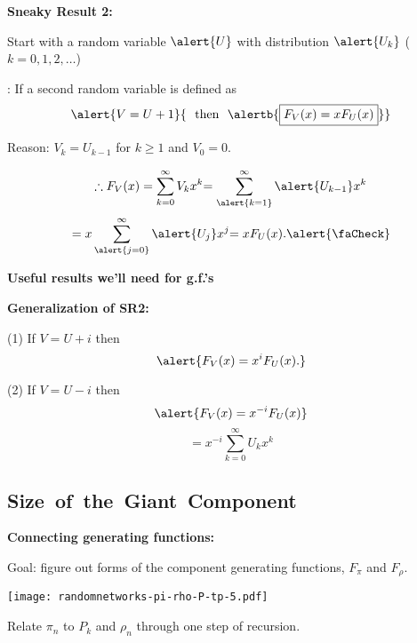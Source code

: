 \begin{frame}[label=]
\begin{frame}[label=]
\begin{frame}[label=]
\begin{frame}[label=]
\begin{frame}[label=]
\begin{frame}[label=]
\begin{frame}[label=]
\begin{frame}[label=]
\begin{frame}[label=]
\begin{frame}[label=]
\begin{frame}[label=]
\begin{frame}[label=rn-sneakyresult1]
\begin{frame}[label=]
\begin{frame}[label=]
\begin{frame}[label=rn-sneakyresult2]
  \textbf{Sneaky Result 2:}
    
    
      Start with a random variable $\alert{U}$ with
      distribution $\alert{U_k}$ ($k=0,1,2,\dots$)
     
      : If a second random variable
      is defined as 
      $$
      \alert{ V = U + 1}
      {
        \mbox{\ \ then \ }
        \alertb{
        \boxed{F_{V}(x) = xF_{U}(x)}
        }
      }
      $$
    
      \alert{Reason:} $V_{k} = U_{k-1}$ for $k \ge 1$ and $V_{0}=0$.
    
      $$
      \therefore 
      F_{V}(x)
      = 
      \sum_{k=0}^{\infty} V_k x^k
      {
        =
        \sum_{\alert{k=1}}^{\infty} \alert{U_{k-1}} x^k
      }
      $$
      $$
      {
        =
        x \sum_{\alert{j=0}}^{\infty} \alert{U_{j}} x^j
      }
      {
        =
        x F_U(x).
      }
      {
        \alert{\faCheck}
      }
      $$
    
  


  \textbf{Useful results we'll need for g.f.'s}

  \textbf{Generalization of SR2:}
    
    
    (1) If $V=U+i$ then
    $$
    \alert{F_V(x) = x^i F_U(x).}
    $$
    
    (2) If $V=U-i$ then
     $$
     \alert{
       F_V(x) = x^{-i} F_U(x)
     }
     $$
    {
      $$
      =
      x^{-i} 
      \sum_{{k=0}}^{\infty} {U_{k}} x^k
      $$
     }
    
  


\subsection{Size\ of\ the\ Giant\ Component}

\begin{frame}[label=]
  \textbf{Connecting generating functions:}

  
  
    \alert{Goal:} figure out forms of 
    the component generating functions, $F_\pi$ and $F_\rho$.
  

  \texttt{[image: randomnetworks-pi-rho-P-tp-5.pdf]}

  
   
    Relate $\pi_n$ to $P_k$ and $\rho_n$ through
    one step of recursion.
  



\end{frame}
\end{frame}
\end{frame}
\end{frame}
\end{frame}
\end{frame}
\end{frame}
\end{frame}
\end{frame}
\end{frame}
\end{frame}
\end{frame}
\end{frame}
\end{frame}
\end{frame}
\end{frame}
